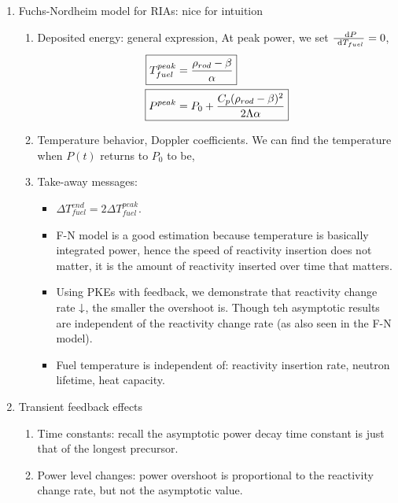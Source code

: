 \documentclass{school-22.211-notes}
\begin{document}
\clearpage
{}
\begin{enumerate}
\item Fuchs-Nordheim model for RIAs: nice for intuition
  \begin{enumerate}
    \item Deposited energy: general expression, 
      At peak power, we set $\frac{\mbox{ }\mathrm{d} P}{\mbox{ }\mathrm{d} T_{fuel}} = 0$, 
      \begin{align}
        \Aboxed{ T_{fuel}^{peak} &= \frac{\rho_{rod} - \beta}{\alpha} } \\
        \Aboxed{ P^{peak} &= P_0 + \frac{C_p (\rho_{rod} - \beta)^2}{2 \Lambda \alpha} }
      \end{align}

    \item Temperature behavior, Doppler coefficients. We can find the temperature when $P(t)$ returns to $P_0$ to be,     

    \item Take-away messages:
      \begin{itemize}
      \item $\Delta T_{fuel}^{end} = 2 \Delta T_{fuel}^{peak}$. 
      \item F-N model is a good estimation because temperature is basically integrated power, hence the speed of reactivity insertion does not matter, it is the amount of reactivity inserted over time that matters. 
      \item Using PKEs with feedback, we demonstrate that reactivity change rate $\downarrow$, the smaller the overshoot is. Though teh asymptotic results are independent of the reactivity change rate (as also seen in the F-N model). 
      \item Fuel temperature is independent of: reactivity insertion rate, neutron lifetime, heat capacity. 
      \end{itemize}
  \end{enumerate}

\item Transient feedback effects
  \begin{enumerate}
  \item Time constants: recall the asymptotic power decay time constant is just that of the longest precursor. 
  \item Power level changes: power overshoot is proportional to the reactivity change rate, but not the asymptotic value. 
  \end{enumerate}
\end{enumerate}
\end{document}
